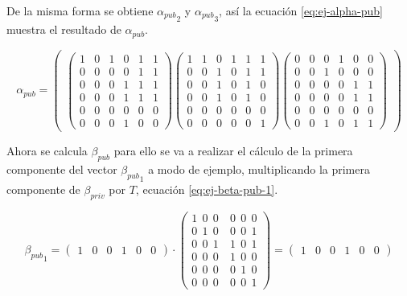 De la misma forma se obtiene ${\alpha_{pub}}_2$ y ${\alpha_{pub}}_3$, así la ecuación \ref{eq:ej-alpha-pub} muestra el resultado de $\alpha_{pub}$.


\begin{equation}\label{eq:ej-alpha-pub}
{\alpha_{pub}} = 
	\begin{pmatrix}
	\left(\begin{smallmatrix}
		1 & 0 & 1 & 0 & 1 & 1\\
		0 & 0 & 0 & 0 & 1 & 1\\
		0 & 0 & 0 & 1 & 1 & 1\\
		0 & 0 & 0 & 1 & 1 & 1\\
		0 & 0 & 0 & 0 & 0 & 0\\
		0 & 0 & 0 & 1 & 0 & 0
	\end{smallmatrix}\right)
		
	\left(\begin{smallmatrix}
		1 & 1 & 0 & 1 & 1 & 1\\
		0 & 0 & 1 & 0 & 1 & 1\\
		0 & 0 & 1 & 0 & 1 & 0\\
		0 & 0 & 1 & 0 & 1 & 0\\
		0 & 0 & 0 & 0 & 0 & 0\\
		0 & 0 & 0 & 0 & 0 & 1
	\end{smallmatrix}\right)
	
	\left(\begin{smallmatrix}
		0 & 0 & 0 & 1 & 0 & 0\\
		0 & 0 & 1 & 0 & 0 & 0\\
		0 & 0 & 0 & 0 & 1 & 1\\
		0 & 0 & 0 & 0 & 1 & 1\\
		0 & 0 & 0 & 0 & 0 & 0\\
		0 & 0 & 1 & 0 & 1 & 1
	\end{smallmatrix}\right)
	\end{pmatrix}
\end{equation}


Ahora se calcula $\beta_{pub}$ para ello se va a realizar el cálculo de la primera componente del vector ${\beta_{pub}}_1$ a modo de ejemplo, multiplicando la primera componente de $\beta_{priv}$ por $T$, ecuación \ref{eq:ej-beta-pub-1}.

\begin{equation}\label{eq:ej-beta-pub-1}
	{{\beta_{pub}}_1} = 
	\left(\begin{matrix}1 & 0 & 0 & 1 & 0 & 0\end{matrix}\right) \cdot
	\left(\begin{array}{c|c}
		1\ \ 0\ \ 0\ & 0\ \ 0\ \ 0\\
		0\ \ 1\ \ 0\ & 0\ \ 0\ \ 1\\
		0\ \ 0\ \ 1\ & 1\ \ 0\ \ 1\\
		\hline
		0\ \ 0\ \ 0\ & 1\ \ 0\ \ 0\\
		0\ \ 0\ \ 0\ & 0\ \ 1\ \ 0\\
		0\ \ 0\ \ 0\ & 0\ \ 0\ \ 1
	\end{array}\right) =
	\left(\begin{matrix}1 & 0 & 0 & 1 & 0 & 0\end{matrix}\right)
\end{equation}

